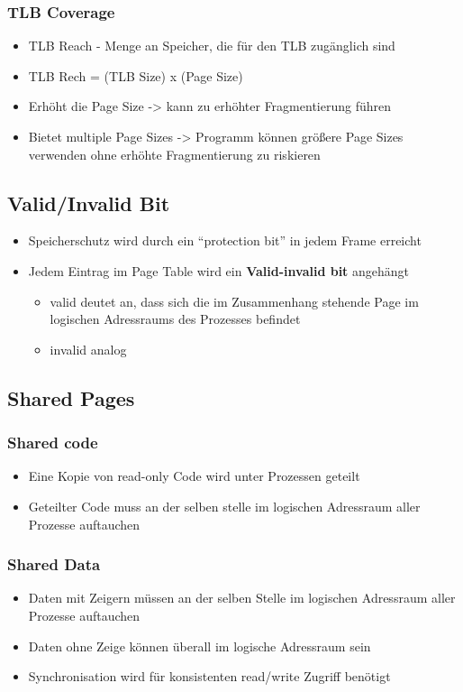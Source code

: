 \documentclass[a4paper]{scrreprt}
\begin{document}
\subsubsection{TLB Coverage}
\begin{itemize}
\item TLB Reach - Menge an Speicher, die für den TLB zugänglich sind
\item TLB Rech = (TLB Size) x (Page Size)

\item Erhöht die Page Size -> kann zu erhöhter Fragmentierung führen
\item Bietet multiple Page Sizes -> Programm können größere Page Sizes verwenden ohne erhöhte Fragmentierung zu riskieren
\end{itemize}

\subsection{Valid/Invalid Bit}
\begin{itemize}
\item Speicherschutz wird durch ein "`protection bit"' in jedem Frame erreicht
\item Jedem Eintrag im Page Table wird ein \textbf{Valid-invalid bit} angehängt
\begin{itemize}
\item valid deutet an, dass sich die im Zusammenhang stehende Page im logischen Adressraums des Prozesses befindet
\item invalid analog

\end{itemize}
\end{itemize}

\subsection{Shared Pages}
\subsubsection{Shared code}
\begin{itemize}
\item Eine Kopie von read-only Code wird unter Prozessen geteilt
\item Geteilter Code muss an der selben stelle im logischen Adressraum aller Prozesse auftauchen
\end{itemize}
\subsubsection{Shared Data}
\begin{itemize}
\item Daten mit Zeigern müssen an der selben Stelle im logischen Adressraum aller Prozesse auftauchen
\item Daten ohne  Zeige können überall im logische Adressraum sein
\item Synchronisation wird für konsistenten read/write Zugriff benötigt
\end{itemize}
\end{document}
